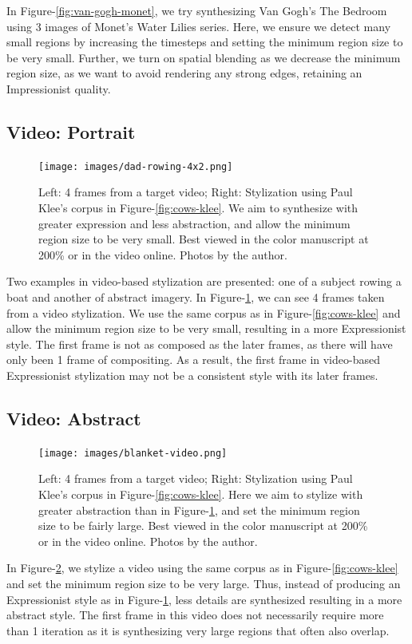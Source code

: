 \documentclass[a4paper,11pt,final]{ThesisStyle}
\begin{document}
In Figure-\ref{fig:van-gogh-monet}, we try synthesizing Van Gogh's The Bedroom using 3 images of Monet's Water Lilies series.  Here, we ensure we detect many small regions by increasing the timesteps and setting the minimum region size to be very small.  Further, we turn on spatial blending as we decrease the minimum region size, as we want to avoid rendering any strong edges, retaining an Impressionist quality.
\subsection{Video: Portrait}
\begin{figure}[ht]
  \centering
  \texttt{[image: images/dad-rowing-4x2.png]}
  \caption{Left: 4 frames from a target video; Right: Stylization using Paul Klee's corpus in Figure-\ref{fig:cows-klee}.  We aim to synthesize with greater expression and less abstraction, and allow the minimum region size to be very small. Best viewed in the color manuscript at 200\% or in the video online. Photos by the author.}
  \label{fig:rowing}
\end{figure}
Two examples in video-based stylization are presented: one of a subject rowing a boat and another of abstract imagery.  In Figure-\ref{fig:rowing}, we can see 4 frames taken from a video stylization.  We use the same corpus as in Figure-\ref{fig:cows-klee} and allow the minimum region size to be very small, resulting in a more Expressionist style.  The first frame is not as composed as the later frames, as there will have only been 1 frame of compositing.  As a result, the first frame in video-based Expressionist stylization may not be a consistent style with its later frames.
\subsection{Video: Abstract}\vspace{-0.4em}
\begin{figure}[ht]
  \centering
  \texttt{[image: images/blanket-video.png]}
  \caption{Left: 4 frames from a target video; Right: Stylization using Paul Klee's corpus in Figure-\ref{fig:cows-klee}.  Here we aim to stylize with greater abstraction than in Figure-\ref{fig:rowing}, and set the minimum region size to be fairly large. Best viewed in the color manuscript at 200\% or in the video online.   Photos by the author.}
  \label{fig:blanket-video}
\end{figure}
In Figure-\ref{fig:blanket-video}, we stylize a video using the same corpus as in Figure-\ref{fig:cows-klee} and set the minimum region size to be very large.  Thus, instead of producing an Expressionist style as in Figure-\ref{fig:rowing}, less details are synthesized resulting in a more abstract style.  The first frame in this video does not necessarily require more than 1 iteration as it is synthesizing very large regions that often also overlap.
\end{document}
